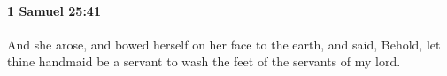 
		\paragraph{1 Samuel 25:41} %
			\label{1SAMUEL-25-41}

			And she arose, and bowed herself on her face to the earth, and said, Behold, let thine handmaid be a servant to wash the feet of the servants of my lord.


